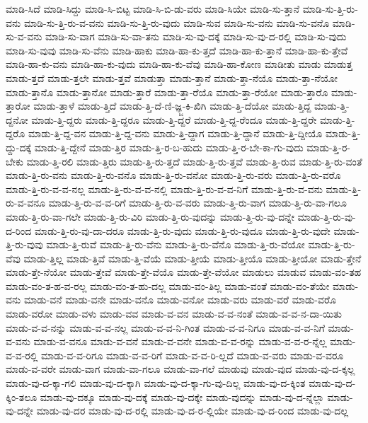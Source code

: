{ಮಾಡಿ-ಸಿದೆ
ಮಾಡಿ-ಸಿದ್ದು
ಮಾಡಿ-ಸಿ-ಬಿಟ್ಟ
ಮಾಡಿ-ಸಿ-ಬಿ-ಡು-ವರು
ಮಾಡಿ-ಸಿಯೇ
ಮಾಡಿ-ಸು-ತ್ತಾನೆ
ಮಾಡಿ-ಸು-ತ್ತಿ-ರು-ವನು
ಮಾಡಿ-ಸು-ತ್ತಿ-ರು-ವ-ವನು
ಮಾಡಿ-ಸು-ತ್ತಿ-ರು-ವುದು
ಮಾಡಿ-ಸುವ
ಮಾಡಿ-ಸು-ವನು
ಮಾಡಿ-ಸು-ವನೊ
ಮಾಡಿ-ಸು-ವ-ವನು
ಮಾಡಿ-ಸು-ವಾಗ
ಮಾಡಿ-ಸು-ವಾ-ತನು
ಮಾಡಿ-ಸು-ವು-ದಕ್ಕೆ
ಮಾಡಿ-ಸು-ವು-ದ-ರಲ್ಲಿ
ಮಾಡಿ-ಸು-ವುದು
ಮಾಡಿ-ಸು-ವುವು
ಮಾಡಿ-ಸು-ವೆನು
ಮಾಡಿ-ಹಾಕು
ಮಾಡಿ-ಹಾ-ಕು-ತ್ತದೆ
ಮಾಡಿ-ಹಾ-ಕು-ತ್ತಾನೆ
ಮಾಡಿ-ಹಾ-ಕು-ತ್ತೇವೆ
ಮಾಡಿ-ಹಾ-ಕು-ವನು
ಮಾಡಿ-ಹಾ-ಕು-ವುದು
ಮಾಡಿ-ಹಾ-ಕು-ವೆವು
ಮಾಡಿ-ಹಾ-ಕೋಣ
ಮಾಡೀತು
ಮಾಡು
ಮಾಡುತ್ತ
ಮಾಡು-ತ್ತದೆ
ಮಾಡು-ತ್ತಲೇ
ಮಾಡು-ತ್ತವೆ
ಮಾಡುತ್ತಾ
ಮಾಡು-ತ್ತಾನೆ
ಮಾಡು-ತ್ತಾ-ನೆಯೊ
ಮಾಡು-ತ್ತಾ-ನೆಯೋ
ಮಾಡು-ತ್ತಾನೊ
ಮಾಡು-ತ್ತಾನೋ
ಮಾಡು-ತ್ತಾರೆ
ಮಾಡು-ತ್ತಾ-ರೆಯೊ
ಮಾಡು-ತ್ತಾ-ರೆಯೋ
ಮಾಡು-ತ್ತಾರೊ
ಮಾಡು-ತ್ತಾರೋ
ಮಾಡು-ತ್ತಾಳೆ
ಮಾಡು-ತ್ತಿದೆ
ಮಾಡು-ತ್ತಿ-ದೆ-ಣಿ-ಜ್ಞ್ಜ-ಕಿ-ಖಿಗಿ
ಮಾಡು-ತ್ತಿ-ದೆಯೋ
ಮಾಡು-ತ್ತಿದ್ದ
ಮಾಡು-ತ್ತಿ-ದ್ದನೋ
ಮಾಡು-ತ್ತಿ-ದ್ದರು
ಮಾಡು-ತ್ತಿ-ದ್ದರೂ
ಮಾಡು-ತ್ತಿ-ದ್ದರೆ
ಮಾಡು-ತ್ತಿ-ದ್ದ-ರೆಂದೂ
ಮಾಡು-ತ್ತಿ-ದ್ದರೇ
ಮಾಡು-ತ್ತಿ-ದ್ದರೊ
ಮಾಡು-ತ್ತಿ-ದ್ದ-ವನ
ಮಾಡು-ತ್ತಿ-ದ್ದ-ವನು
ಮಾಡು-ತ್ತಿ-ದ್ದಾಗ
ಮಾಡು-ತ್ತಿ-ದ್ದಾನೆ
ಮಾಡು-ತ್ತಿ-ದ್ದೀಯೊ
ಮಾಡು-ತ್ತಿ-ದ್ದು-ದಕ್ಕೆ
ಮಾಡು-ತ್ತಿ-ದ್ದೇನೆ
ಮಾಡು-ತ್ತಿರ
ಮಾಡು-ತ್ತಿ-ರ-ಬ-ಹುದು
ಮಾಡು-ತ್ತಿ-ರ-ಬೇ-ಕಾ-ಗು-ವುದು
ಮಾಡು-ತ್ತಿ-ರ-ಬೇಕು
ಮಾಡು-ತ್ತಿ-ರಲಿ
ಮಾಡು-ತ್ತಿರು
ಮಾಡು-ತ್ತಿ-ರು-ತ್ತದೆ
ಮಾಡು-ತ್ತಿ-ರು-ತ್ತವೆ
ಮಾಡು-ತ್ತಿ-ರುವ
ಮಾಡು-ತ್ತಿ-ರು-ವಂತೆ
ಮಾಡು-ತ್ತಿ-ರು-ವನು
ಮಾಡು-ತ್ತಿ-ರು-ವನೊ
ಮಾಡು-ತ್ತಿ-ರು-ವನೋ
ಮಾಡು-ತ್ತಿ-ರು-ವರು
ಮಾಡು-ತ್ತಿ-ರು-ವರೊ
ಮಾಡು-ತ್ತಿ-ರು-ವ-ವ-ನಲ್ಲ
ಮಾಡು-ತ್ತಿ-ರು-ವ-ವ-ನಲ್ಲಿ
ಮಾಡು-ತ್ತಿ-ರು-ವ-ವ-ನಿಗೆ
ಮಾಡು-ತ್ತಿ-ರು-ವ-ವನು
ಮಾಡು-ತ್ತಿ-ರು-ವ-ವನೂ
ಮಾಡು-ತ್ತಿ-ರು-ವ-ವ-ರಿಗೆ
ಮಾಡು-ತ್ತಿ-ರು-ವ-ವರು
ಮಾಡು-ತ್ತಿ-ರು-ವಾಗ
ಮಾಡು-ತ್ತಿ-ರು-ವಾ-ಗಲೂ
ಮಾಡು-ತ್ತಿ-ರು-ವಾ-ಗಲೇ
ಮಾಡು-ತ್ತಿ-ರು-ವಿರಿ
ಮಾಡು-ತ್ತಿ-ರು-ವುದನ್ನು
ಮಾಡು-ತ್ತಿ-ರು-ವು-ದನ್ನೇ
ಮಾಡು-ತ್ತಿ-ರು-ವು-ದ-ರಿಂದ
ಮಾಡು-ತ್ತಿ-ರು-ವು-ದಾ-ದರೂ
ಮಾಡು-ತ್ತಿ-ರು-ವುದು
ಮಾಡು-ತ್ತಿ-ರು-ವುದೂ
ಮಾಡು-ತ್ತಿ-ರು-ವುದೇ
ಮಾಡು-ತ್ತಿ-ರು-ವುವು
ಮಾಡು-ತ್ತಿ-ರುವೆ
ಮಾಡು-ತ್ತಿ-ರು-ವೆನು
ಮಾಡು-ತ್ತಿ-ರು-ವೆನೊ
ಮಾಡು-ತ್ತಿ-ರು-ವೆಯೋ
ಮಾಡು-ತ್ತಿ-ರು-ವೆವು
ಮಾಡು-ತ್ತಿಲ್ಲ
ಮಾಡು-ತ್ತಿವೆ
ಮಾಡು-ತ್ತಿ-ವೆಯೆ
ಮಾಡು-ತ್ತೀಯೆ
ಮಾಡು-ತ್ತೀಯೊ
ಮಾಡು-ತ್ತೀಯೋ
ಮಾಡು-ತ್ತೇನೆ
ಮಾಡು-ತ್ತೇ-ನೆಯೋ
ಮಾಡು-ತ್ತೇವೆ
ಮಾಡು-ತ್ತೇ-ವೆಯೊ
ಮಾಡು-ತ್ತೇ-ವೆಯೋ
ಮಾಡುಲು
ಮಾಡುವ
ಮಾಡು-ವಂ-ತಹ
ಮಾಡು-ವಂ-ತ-ಹ-ವ-ರಲ್ಲ
ಮಾಡು-ವಂ-ತ-ಹು-ದಲ್ಲ
ಮಾಡು-ವಂ-ತಿಲ್ಲ
ಮಾಡು-ವಂತೆ
ಮಾಡು-ವಂ-ತೆಯೇ
ಮಾಡು-ವನು
ಮಾಡು-ವನೆ
ಮಾಡು-ವನೇ
ಮಾಡು-ವನೊ
ಮಾಡು-ವನೋ
ಮಾಡು-ವರು
ಮಾಡು-ವರೆ
ಮಾಡು-ವರೊ
ಮಾಡು-ವರೋ
ಮಾಡು-ವಳು
ಮಾಡು-ವವ
ಮಾಡು-ವ-ವನ
ಮಾಡು-ವ-ವ-ನಂತೆ
ಮಾಡು-ವ-ವ-ನ-ದಾ-ಯಿತು
ಮಾಡು-ವ-ವ-ನನ್ನು
ಮಾಡು-ವ-ವ-ನಲ್ಲ
ಮಾಡು-ವ-ವ-ನಿ-ಗಿಂತ
ಮಾಡು-ವ-ವ-ನಿಗೂ
ಮಾಡು-ವ-ವ-ನಿಗೆ
ಮಾಡು-ವ-ವನು
ಮಾಡು-ವ-ವನೂ
ಮಾಡು-ವ-ವನೆ
ಮಾಡು-ವ-ವನೇ
ಮಾಡು-ವ-ವ-ರನ್ನು
ಮಾಡು-ವ-ವ-ರ-ನ್ನೆಲ್ಲ
ಮಾಡು-ವ-ವ-ರಲ್ಲಿ
ಮಾಡು-ವ-ವ-ರಿಗೂ
ಮಾಡು-ವ-ವ-ರಿಗೆ
ಮಾಡು-ವ-ವ-ರಿ-ಲ್ಲದೆ
ಮಾಡು-ವ-ವರು
ಮಾಡು-ವ-ವರೂ
ಮಾಡು-ವ-ವರೇ
ಮಾಡು-ವಾಗ
ಮಾಡು-ವಾ-ಗಲೂ
ಮಾಡು-ವಾ-ಗಲೆ
ಮಾಡುವು
ಮಾಡು-ವುದ
ಮಾಡು-ವು-ದ-ಕ್ಕಲ್ಲ
ಮಾಡು-ವು-ದ-ಕ್ಕಾ-ಗಲಿ
ಮಾಡು-ವು-ದ-ಕ್ಕಾಗಿ
ಮಾಡು-ವು-ದ-ಕ್ಕಾ-ಗು-ವು-ದಿಲ್ಲ
ಮಾಡು-ವು-ದ-ಕ್ಕಿಂತ
ಮಾಡು-ವು-ದ-ಕ್ಕಿಂ-ತಲೂ
ಮಾಡು-ವು-ದಕ್ಕೂ
ಮಾಡು-ವು-ದಕ್ಕೆ
ಮಾಡು-ವು-ದಕ್ಕೇ
ಮಾಡು-ವುದನ್ನು
ಮಾಡು-ವು-ದ-ನ್ನೆಲ್ಲಾ
ಮಾಡು-ವು-ದನ್ನೇ
ಮಾಡು-ವು-ದರ
ಮಾಡು-ವು-ದ-ರಲ್ಲಿ
ಮಾಡು-ವು-ದ-ರ-ಲ್ಲಿಯೇ
ಮಾಡು-ವು-ದ-ರಿಂದ
ಮಾಡು-ವು-ದಲ್ಲ
}
